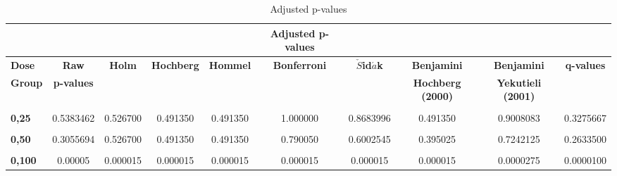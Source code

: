 \documentclass[12pt,oneside]{report}
\theoremstyle{definition}
\theoremstyle{mystyle}
\begin{document}
\begin{table}
	\caption{Adjusted p-values}
	\label{tab:mult}
	\bigskip
	\centering\small\setlength\tabcolsep{2pt}
	\hspace*{-1cm}\begin{tabular}{l  c c c c c c c c c      } \toprule \toprule
		&  &  &  &  & \textbf{Adjusted p-values} &  &  &  &                            \\  \toprule
		
		\textbf{Dose } &\textbf{Raw} &\textbf{Holm} &\textbf{Hochberg} &\textbf{Hommel} &\textbf{Bonferroni}&\textbf{$\check{S}$id$\acute{a}$k} &\textbf{Benjamini} &\textbf{Benjamini} &\textbf{q-values}      \\
		\textbf{ Group} &\textbf{p-values} & &\textbf{} &\textbf{} &\textbf{} &\textbf{} &\textbf{Hochberg (2000)} &\textbf{Yekutieli (2001)} &\textbf{}    \\
		\bottomrule
		&&&&&&&&\\
		\textbf{0,25}  &  0.5383462 & 0.526700 &0.491350  & 0.491350   &1.000000 &0.8683996 & 0.491350 & 0.9008083&0.3275667          \\  \bottomrule
		&&&&&&&&\\
		\textbf{0,50 }  & 0.3055694 & 0.526700  &0.491350   &0.491350   &0.790050& 0.6002545  &0.395025  & 0.7242125 &0.2633500          \\ \hline
		&&&&&&&&\\
		\textbf{0,100} & 0.00005 & 0.000015 &0.000015  &0.000015  &0.000015& 0.000015 & 0.000015 & 0.0000275 & 0.0000100           \\ \bottomrule \bottomrule
	\end{tabular}\hspace*{-1cm}
\end{table}
\end{document}
